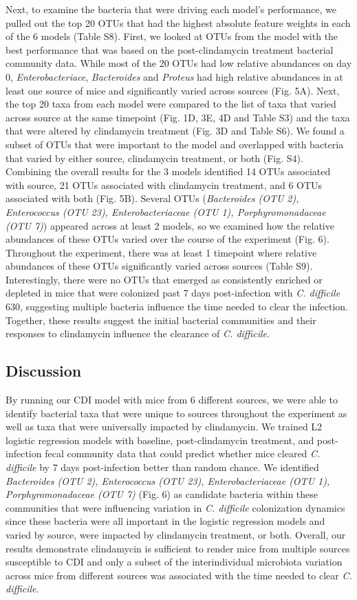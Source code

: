 \documentclass[11pt,]{article}
\begin{document}
Next, to examine the bacteria that were driving each model's
performance, we pulled out the top 20 OTUs that had the highest absolute
feature weights in each of the 6 models (Table S8). First, we looked at
OTUs from the model with the best performance that was based on the
post-clindamycin treatment bacterial community data. While most of the
20 OTUs had low relative abundances on day 0, \emph{Enterobacteriace},
\emph{Bacteroides} and \emph{Proteus} had high relative abundances in at
least one source of mice and significantly varied across sources (Fig.
5A). Next, the top 20 taxa from each model were compared to the list of
taxa that varied across source at the same timepoint (Fig. 1D, 3E, 4D
and Table S3) and the taxa that were altered by clindamycin treatment
(Fig. 3D and Table S6). We found a subset of OTUs that were important to
the model and overlapped with bacteria that varied by either source,
clindamycin treatment, or both (Fig. S4). Combining the overall results
for the 3 models identified 14 OTUs associated with source, 21 OTUs
associated with clindamycin treatment, and 6 OTUs associated with both
(Fig. 5B). Several OTUs (\emph{Bacteroides (OTU 2), Enterococcus (OTU
23), Enterobacteriaceae (OTU 1), Porphyromonadaceae (OTU 7)}) appeared
across at least 2 models, so we examined how the relative abundances of
these OTUs varied over the course of the experiment (Fig. 6). Throughout
the experiment, there was at least 1 timepoint where relative abundances
of these OTUs significantly varied across sources (Table S9).
Interestingly, there were no OTUs that emerged as consistently enriched
or depleted in mice that were colonized past 7 days post-infection with
\emph{C. difficile} 630, suggesting multiple bacteria influence the time
needed to clear the infection. Together, these results suggest the
initial bacterial communities and their responses to clindamycin
influence the clearance of \emph{C. difficile}.

\subsection{Discussion}\label{discussion}

By running our CDI model with mice from 6 different sources, we were
able to identify bacterial taxa that were unique to sources throughout
the experiment as well as taxa that were universally impacted by
clindamycin. We trained L2 logistic regression models with baseline,
post-clindamycin treatment, and post-infection fecal community data that
could predict whether mice cleared \emph{C. difficile} by 7 days
post-infection better than random chance. We identified
\emph{Bacteroides (OTU 2), Enterococcus (OTU 23), Enterobacteriaceae
(OTU 1), Porphyromonadaceae (OTU 7)} (Fig. 6) as candidate bacteria
within these communities that were influencing variation in \emph{C.
difficile} colonization dynamics since these bacteria were all important
in the logistic regression models and varied by source, were impacted by
clindamycin treatment, or both. Overall, our results demonstrate
clindamycin is sufficient to render mice from multiple sources
susceptible to CDI and only a subset of the interindividual microbiota
variation across mice from different sources was associated with the
time needed to clear \emph{C. difficile}.
\end{document}
